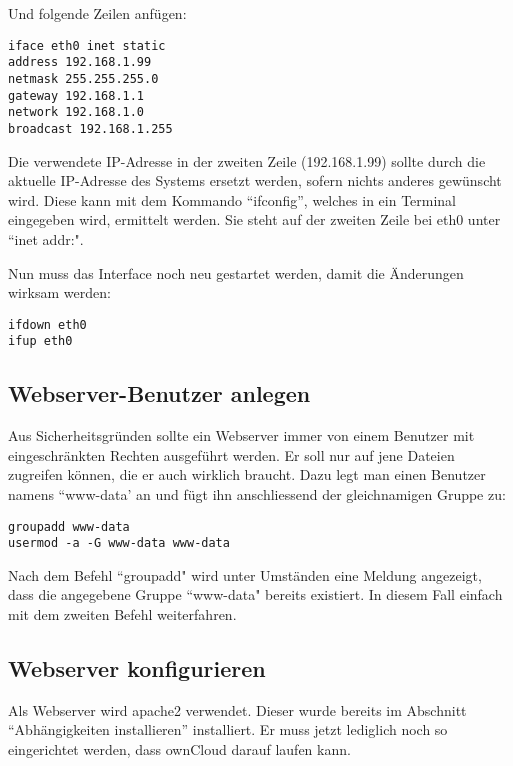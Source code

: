 Und folgende Zeilen anfügen:
\begin{lstlisting}
iface eth0 inet static
address 192.168.1.99
netmask 255.255.255.0
gateway 192.168.1.1
network 192.168.1.0
broadcast 192.168.1.255
\end{lstlisting}

    
Die verwendete IP-Adresse in der zweiten Zeile (192.168.1.99) sollte durch die aktuelle IP-Adresse des Systems ersetzt werden, sofern nichts anderes gewünscht wird. Diese kann mit dem Kommando ``ifconfig'', welches in ein Terminal eingegeben wird, ermittelt werden. Sie steht auf der zweiten Zeile bei eth0 unter ``inet addr:".


Nun muss das Interface noch neu gestartet werden, damit die Änderungen wirksam werden:

\begin{lstlisting}
ifdown eth0
ifup eth0
\end{lstlisting}

\subsection{Webserver-Benutzer anlegen}
Aus Sicherheitsgründen sollte ein Webserver immer von einem Benutzer mit eingeschränkten Rechten ausgeführt werden. Er soll nur auf jene Dateien zugreifen können, die er auch wirklich braucht. Dazu legt man einen Benutzer namens ``www-data' an und fügt ihn anschliessend der gleichnamigen Gruppe zu:

\begin{lstlisting}
groupadd www-data
usermod -a -G www-data www-data
\end{lstlisting}

Nach dem Befehl ``groupadd" wird unter Umständen eine Meldung angezeigt, dass die angegebene Gruppe ``www-data" bereits existiert. In diesem Fall einfach mit dem zweiten Befehl weiterfahren.

\subsection{Webserver konfigurieren}
Als Webserver wird apache2 verwendet. Dieser wurde bereits im Abschnitt ``Abhängigkeiten installieren'' installiert. Er muss jetzt lediglich noch so eingerichtet werden, 
dass ownCloud darauf laufen kann.

